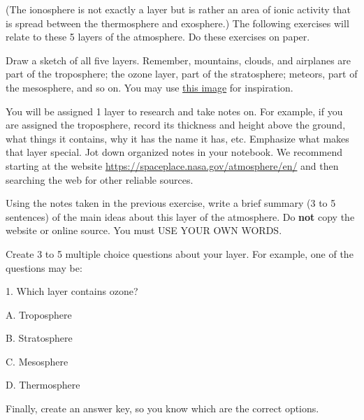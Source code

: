 \documentclass{article}
\numberwithin{equation}{section}
\numberwithin{figure}{section}
\begin{document}
(The ionosphere is not exactly a layer but is rather an area of ionic activity that is spread between the thermosphere and exosphere.) The following exercises will relate to these 5 layers of the atmosphere. Do these exercises on paper.

\begin{exercise}
    Draw a sketch of all five layers. Remember, mountains, clouds, and airplanes are part of the troposphere; the ozone layer, part of the stratosphere; meteors, part of the mesosphere, and so on. You may use \href{https://en.wikipedia.org/wiki/Atmosphere#/media/File:Atmosphere_layers-en.svg}{this image} for inspiration.
\end{exercise}

\begin{exercise} \label{WsEZii}
    You will be assigned 1 layer to research and take notes on. For example, if you are assigned the troposphere, record its thickness and height above the ground, what things it contains, why it has the name it has, etc. Emphasize what makes that layer special. Jot down organized notes in your notebook. We recommend starting at the website \href{https://spaceplace.nasa.gov/atmosphere/en/}{https://spaceplace.nasa.gov/atmosphere/en/} and then searching the web for other reliable sources.
\end{exercise}

\begin{exercise}
    Using the notes taken in the previous exercise, write a brief summary (3 to 5 sentences) of the main ideas about this layer of the atmosphere. Do \textbf{not} copy the website or online source. You must USE YOUR OWN WORDS.
\end{exercise}

\begin{exercise} \label{XqVzFv}
    Create 3 to 5 multiple choice questions about your layer. For example, one of the questions may be:
    \vspace{1em}
    
    \hspace{2em} 1. Which layer contains ozone?
    
    \hspace{3.5em} A. Troposphere
    
    \hspace{3.5em} B. Stratosphere

    \hspace{3.5em} C. Mesosphere

    \hspace{3.5em} D. Thermosphere

    \vspace{1em}

    Finally, create an answer key, so you know which are the correct options.
\end{exercise}
\end{document}
